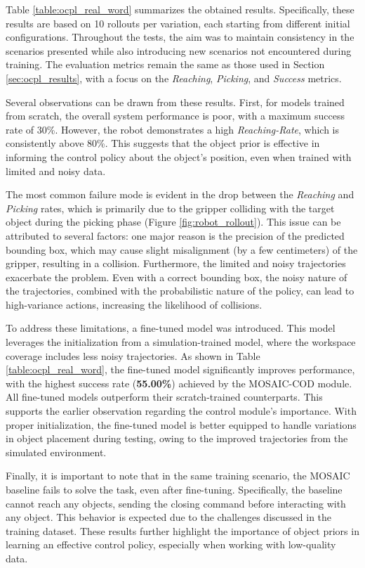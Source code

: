 Table \ref{table:ocpl_real_word} summarizes the obtained results. Specifically, these results are based on 10 rollouts per variation, each starting from different initial configurations. Throughout the tests, the aim was to maintain consistency in the scenarios presented while also introducing new scenarios not encountered during training. The evaluation metrics remain the same as those used in Section \ref{sec:ocpl_results}, with a focus on the \textit{Reaching}, \textit{Picking}, and \textit{Success} metrics.


Several observations can be drawn from these results. First, for models trained from scratch, the overall system performance is poor, with a maximum success rate of 30\%. However, the robot demonstrates a high \textit{Reaching-Rate}, which is consistently above 80\%. This suggests that the object prior is effective in informing the control policy about the object's position, even when trained with limited and noisy data. 

The most common failure mode is evident in the drop between the \textit{Reaching} and \textit{Picking} rates, which is primarily due to the gripper colliding with the target object during the picking phase (Figure \ref{fig:robot_rollout}). This issue can be attributed to several factors: one major reason is the precision of the predicted bounding box, which may cause slight misalignment (by a few centimeters) of the gripper, resulting in a collision. Furthermore, the limited and noisy trajectories exacerbate the problem. Even with a correct bounding box, the noisy nature of the trajectories, combined with the probabilistic nature of the policy, can lead to high-variance actions, increasing the likelihood of collisions.


To address these limitations, a fine-tuned model was introduced. This model leverages the initialization from a simulation-trained model, where the workspace coverage includes less noisy trajectories. As shown in Table \ref{table:ocpl_real_word}, the fine-tuned model significantly improves performance, with the highest success rate (\textbf{55.00\%}) achieved by the MOSAIC-COD module. All fine-tuned models outperform their scratch-trained counterparts. This supports the earlier observation regarding the control module's importance. With proper initialization, the fine-tuned model is better equipped to handle variations in object placement during testing, owing to the improved trajectories from the simulated environment.

Finally, it is important to note that in the same training scenario, the MOSAIC baseline fails to solve the task, even after fine-tuning. Specifically, the baseline cannot reach any objects, sending the closing command before interacting with any object. This behavior is expected due to the challenges discussed in the training dataset. These results further highlight the importance of object priors in learning an effective control policy, especially when working with low-quality data.

